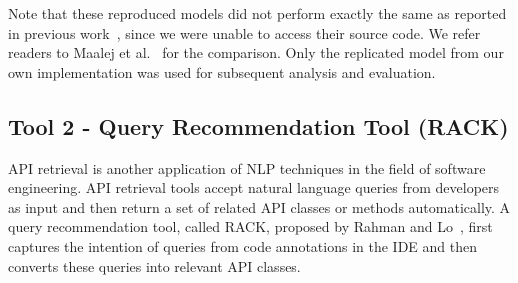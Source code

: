 \documentclass[conference]{IEEEtran}
\begin{document}
\begin{sloppy}
Note that these reproduced models did not perform exactly the same as reported in previous work~\cite{maalej2016automatic}, since we were unable to access their source code. We refer readers to Maalej et al.~\cite{maalej2016automatic} for the comparison. Only the replicated model from our own implementation was used for subsequent analysis and evaluation. 

\subsection{Tool 2 - Query Recommendation Tool (RACK)}

API retrieval is another application of NLP techniques in the field of software engineering. API retrieval tools accept natural language queries from developers as input and then return a set of related API classes or methods automatically. A query recommendation tool, called RACK, proposed by Rahman and Lo~\cite{rahman2017rack}, first captures the intention of queries from code annotations in the IDE and then converts these queries into relevant API classes. 


\end{sloppy}
\end{document}
